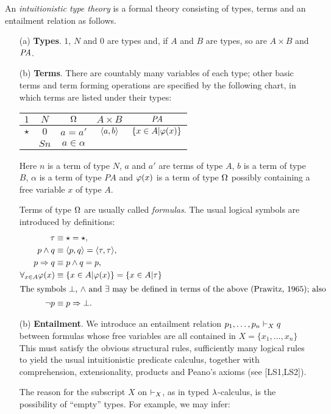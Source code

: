 \begin{defn}
An {\em intuitionistic type theory} is a formal theory consisting of
types, terms and an entailment relation as follows.
\begin{enumerate}
\item[(a)] {\bf Types}. $1$, $N$ and $0$ are types and, if $A$ and $B$ are types, so
are $A \times B$ and $\mathit{PA}$.
\item[(b)] {\bf Terms}. There are countably many variables of each type; other basic
terms and term forming operations are specified by the following chart, in
which terms are listed under their types:
\begin{center}
\begin{tabular}{ c c c c c }
$1$ & $N$ & $\Omega$ & $A \times B$ & $\mathit{PA}$\\
\hline
$\star$ & $0$ & $a = a'$ & $\langle a,b \rangle$& $\{x \in A | \varphi (x)\}$\\
&$S n$&$a \in \alpha$\\
\end{tabular}
\end{center}
\medskip
Here $n$ is a term of type $N$, $a$ and $a'$ are terms of type $A$, $b$ is a term
of type $B$, $\alpha$ is a term of type $PA$ and $\varphi(x)$ is a term of type $\Omega$
possibly containing a free variable $x$ of type $A$.

Terms of type $\Omega$ are usually called {\em formulas}. The usual logical symbols
are introduced by definitions:
\begin{align*}
\tau &\equiv \star = \star,\\
p \sland q &\equiv \la p,q \ra = \la \tau, \tau\ra,\\
p \impl q &\equiv p \sland q = p,\\
\forall_{x \in A} \pf(x) &\equiv \{ x \in A | \pf(x)\} = \{x \in A | \tau\}\\
\intertext{The symbols $\bot$, $\wedge$ and $\exists$ may be defined in terms of the above (Prawitz,
1965); also}%
\neg p &\equiv p \impl \bot .
\end{align*}
\item[(b)] {\bf Entailment}. We introduce an entailment relation $p_1, \dots, p_n \vdash_X q$
between formulas whose free variables are all contained in $X = \{x_1, \dots, x_n\}$
This must satisfy the obvious structural rules, sufficiently many logical
rules to yield the usual intuitionistic predicate calculus, together with
comprehension, extensionality, products and Peano's axioms (see [LS1,LS2]).

The reason for the subscript $X$ on $\vdash_X$, as in typed $\lambda$-calculus, is the
possibility of ``empty'' types. For example, we may infer:
\end{enumerate}
\end{defn}




